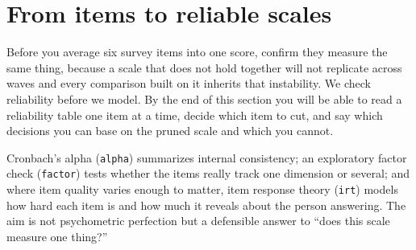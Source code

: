 \section{From items to reliable scales}
Before you average six survey items into one score, confirm they measure the same thing, because a scale that does not hold together will not replicate across waves and every comparison built on it inherits that instability. We check reliability before we model. By the end of this section you will be able to read a reliability table one item at a time, decide which item to cut, and say which decisions you can base on the pruned scale and which you cannot.

Cronbach's alpha (\texttt{alpha}) summarizes internal consistency; an exploratory factor check (\texttt{factor}) tests whether the items really track one dimension or several; and where item quality varies enough to matter, item response theory (\texttt{irt}) models how hard each item is and how much it reveals about the person answering. The aim is not psychometric perfection but a defensible answer to \enquote{does this scale measure one thing?}

